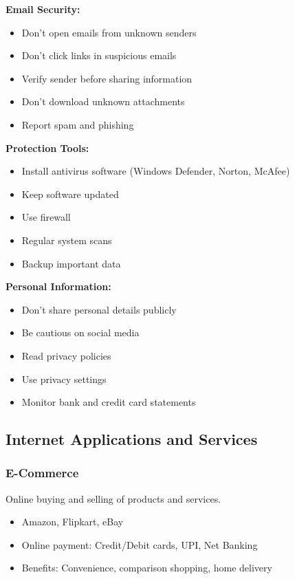 \documentclass[12pt,a4paper]{article}
\begin{document}
\textbf{Email Security:}
\begin{itemize}
    \item Don't open emails from unknown senders
    \item Don't click links in suspicious emails
    \item Verify sender before sharing information
    \item Don't download unknown attachments
    \item Report spam and phishing
\end{itemize}

\textbf{Protection Tools:}
\begin{itemize}
    \item Install antivirus software (Windows Defender, Norton, McAfee)
    \item Keep software updated
    \item Use firewall
    \item Regular system scans
    \item Backup important data
\end{itemize}

\textbf{Personal Information:}
\begin{itemize}
    \item Don't share personal details publicly
    \item Be cautious on social media
    \item Read privacy policies
    \item Use privacy settings
    \item Monitor bank and credit card statements
\end{itemize}

\subsection{Internet Applications and Services}

\subsubsection{E-Commerce}
Online buying and selling of products and services.
\begin{itemize}
    \item Amazon, Flipkart, eBay
    \item Online payment: Credit/Debit cards, UPI, Net Banking
    \item Benefits: Convenience, comparison shopping, home delivery
\end{itemize}
\end{document}
